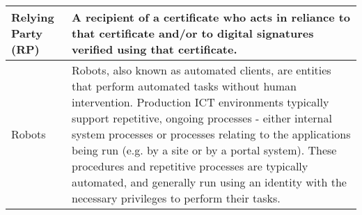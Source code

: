 \begin{tabular}{|p{}|p{}|}
\hline
Relying Party (RP) & 
A recipient of a certificate who acts in reliance to that certificate and/or to digital signatures verified using that certificate. \\
\hline
Robots &
Robots, also known as automated clients, are entities that perform automated tasks without human intervention. Production ICT environments typically support repetitive, ongoing processes - either internal system processes or processes relating to the applications being run (e.g. by a site or by a portal system). These procedures and repetitive processes are typically automated, and generally run using an identity with the necessary privileges to perform their tasks. \\
\hline
\end{tabular}


